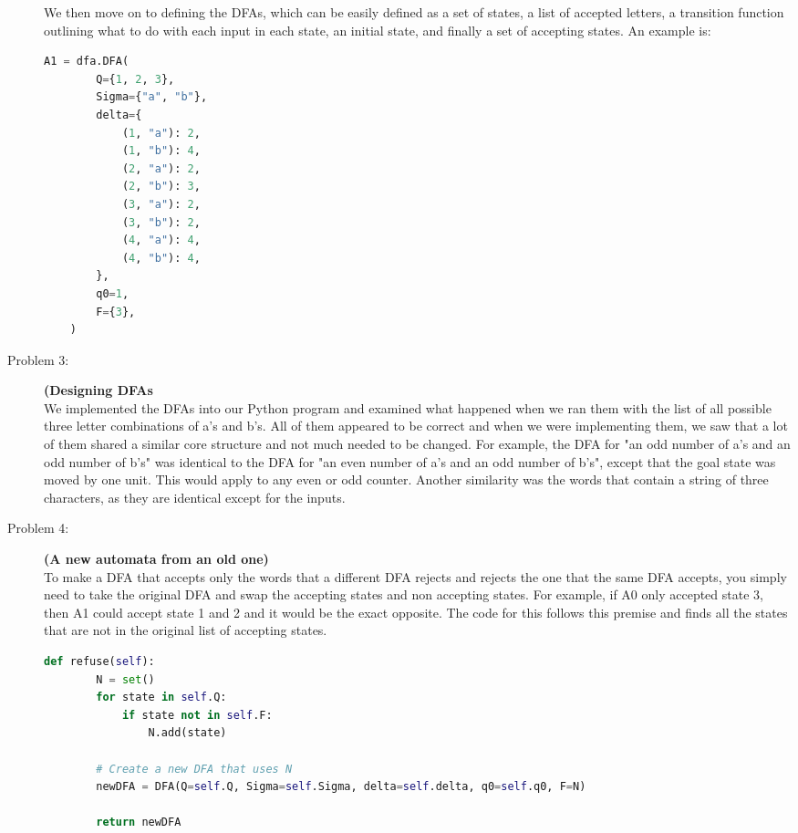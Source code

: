 \documentclass{article}
\theoremstyle{theorem}
\theoremstyle{definition}
\theoremstyle{remark}
\begin{document}
\begin{description}
We then move on to defining the DFAs, which can be easily defined as a set of states, a list of accepted letters, a transition function outlining what to do with each input in each state, an initial state, and finally a set of accepting states. An example is:
\begin{lstlisting}[language=Python]
  A1 = dfa.DFA(
        Q={1, 2, 3},
        Sigma={"a", "b"},
        delta={
            (1, "a"): 2,
            (1, "b"): 4,
            (2, "a"): 2,
            (2, "b"): 3,
            (3, "a"): 2,
            (3, "b"): 2,
            (4, "a"): 4,
            (4, "b"): 4,
        },
        q0=1,
        F={3},
    )
\end{lstlisting}
\item[Problem 3: ] \textbf{(Designing DFAs}\\
We implemented the DFAs into our Python program and examined what happened when we ran them with the list of all possible three letter combinations of a's and b's. All of them appeared to be correct and when we were implementing them, we saw that a lot of them shared a similar core structure and not much needed to be changed. For example, the DFA for "an odd number of a's and an odd number of b's" was identical to the DFA for "an even number of a's and an odd number of b's", except that the goal state was moved by one unit. This would apply to any even or odd counter. Another similarity was the words that contain a string of three characters, as they are identical except for the inputs.

\item[Problem 4: ] \textbf{(A new automata from an old one)}\\
To make a DFA that accepts only the words that a different DFA rejects and rejects the one that the same DFA accepts, you simply need to take the original DFA and swap the accepting states and non accepting states. For example, if A0 only accepted state 3, then A1 could accept state 1 and 2 and it would be the exact opposite. The code for this follows this premise and finds all the states that are not in the original list of accepting states.

\begin{lstlisting}[language=Python]
  def refuse(self):
        N = set()
        for state in self.Q:
            if state not in self.F:
                N.add(state)

        # Create a new DFA that uses N
        newDFA = DFA(Q=self.Q, Sigma=self.Sigma, delta=self.delta, q0=self.q0, F=N)

        return newDFA
\end{lstlisting}
\end{description}
\end{document}
